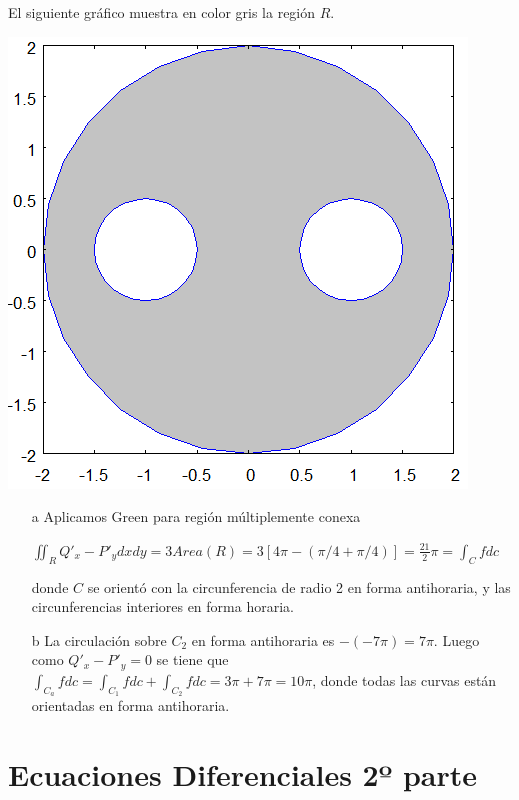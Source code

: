 El siguiente gráfico muestra en color gris la región $R$.

\begin{center}
\includegraphics{images/04_analisis2/segundo_parcial_2_3_2012.png}
\end{center}

\begin{itemize}
\item[a] Aplicamos Green para región múltiplemente conexa

$ \iint_R Q'_x - P'_y dxdy = 3 Area(R) = 3 [4 \pi - (\pi/4 + \pi/4)] = \frac{21}{2} \pi = \int_C f dc$

donde $C$ se orientó con la circunferencia de radio 2 en forma antihoraria, y las circunferencias interiores en forma horaria.

\item[b] La circulación sobre $C_2$ en forma antihoraria es $-(-7\pi) = 7\pi$.  Luego como $Q'_x - P'_y = 0$ se tiene que $\int_{C_a} f dc = \int_{C_1} f dc + \int_{C_2} f dc = 3 \pi + 7\pi = 10 \pi$, donde todas las curvas están orientadas en forma antihoraria.
\end{itemize}



\chapter{Ecuaciones Diferenciales 2º parte}

